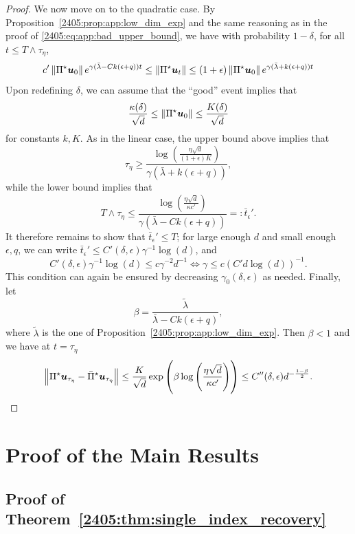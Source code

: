 \begin{proof}
    We now move on to the quadratic case. By Proposition~\ref{2405:prop:app:low_dim_exp} and the same reasoning as in the proof of \eqref{2405:eq:app:bad_upper_bound}, we have with probability $1 - \delta$, for all $t \leq T \wedge \tau_\eta$,
    \[ c' \left\lVert \Pi^\star {\boldsymbol{u}}_0\right\rVert e^{\gamma(\bar\lambda - Ck(\epsilon + q))t} \leq \left\lVert \Pi^\star {\boldsymbol{u}}_t\right\rVert \leq (1 + \epsilon)\left\lVert \Pi^\star {\boldsymbol{u}}_0\right\rVert e^{\gamma(\bar\lambda + k(\epsilon + q))t} \]
    Upon redefining $\delta$, we can assume that the ``good'' event implies that
    \[ \frac{\kappa(\delta)}{\sqrt{d}} \leq \left\lVert \Pi^\star {\boldsymbol{u}}_0\right\rVert \leq \frac{K(\delta)}{\sqrt{d}} \]
    for constants $k, K$. As in the linear case, the upper bound above implies that
    \[ \tau_\eta \geq \frac{\log\left(\frac{\eta\sqrt{d}}{(1+\epsilon)K}\right)}{\gamma(\bar\lambda + k(\epsilon + q))}, \]
    while the lower bound implies that
    \[ T \wedge \tau_\eta \leq \frac{\log\left(\frac{\eta\sqrt{d}}{\kappa c'}\right)}{\gamma(\bar\lambda - Ck(\epsilon + q))} =: \bar t_\epsilon'. \]
    It therefore remains to show that $\bar t_\epsilon' \leq T$; for large enough $d$ and small enough $\epsilon, q$, we can write $\bar t_\epsilon' \leq C'(\delta, \epsilon) \gamma^{-1} \log(d)$, and
    \[ C'(\delta, \epsilon) \gamma^{-1} \log(d) \leq c\gamma^{-2}d^{-1} \Leftrightarrow \gamma \leq c(C' d \log(d))^{-1}.\]
    This condition can again be ensured by decreasing $\gamma_0(\delta, \epsilon)$ as needed. Finally, let 
    \[ \beta = \frac{\tilde\lambda}{\bar\lambda - Ck(\epsilon+q)}, \]
    where $\tilde \lambda$ is the one of Proposition~\ref{2405:prop:app:low_dim_exp}. Then $\beta < 1$ and we have at $t = \tau_\eta$
    \[ \left\lVert \Pi^\star {\boldsymbol{u}}_{\tau_\eta} - \bar\Pi^\star {\boldsymbol{u}}_{\tau_\eta}\right\rVert \leq \frac{K}{\sqrt{d}} \exp\left(\beta \log\left(\frac{\eta\sqrt{d}}{\kappa c'}\right)\right) \leq C''(\delta, \epsilon) d^{-\frac{1 - \beta}{2}}. \]
\end{proof}

\section{Proof of the Main Results}
\label{2405:sec:app:proofs}

\subsection{Proof of Theorem~\ref{2405:thm:single_index_recovery}}

